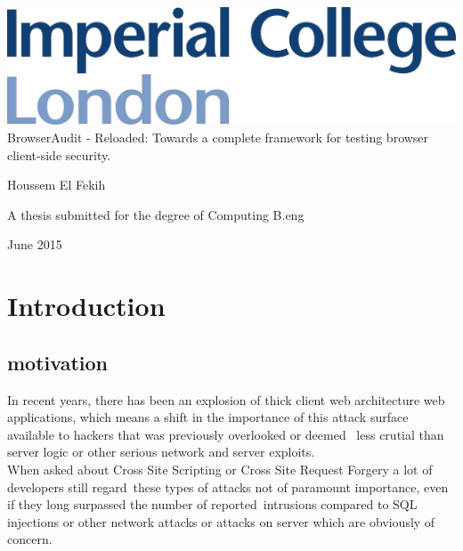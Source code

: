 \documentclass[a4paper,12pt]{report}
\begin{document}
\thispagestyle{empty}
\begin{center}
\begin{minipage}{0.75\linewidth}
    \centering
    \includegraphics[width=1\linewidth]{logo.jpg}
    \vspace{5cm}
    {\Large BrowserAudit - Reloaded: Towards a complete framework for testing browser client-side security.}
    \vspace{3cm}
    {\Large Houssem El Fekih\par}
    \vspace{3cm}
    {\Large A thesis submitted for the degree of Computing B.eng\par}
    \vspace{3cm}
    {\Large June 2015}
\end{minipage}
\end{center}
\clearpage


\begin{abstract}
 
\end{abstract}


\tableofcontents
\listoffigures
\listoftables

\pagebreak
{}

\section{Introduction}

\subsection{motivation}
In recent years, there has been an explosion of thick client web architecture web applications,
which means a shift in the importance of this attack surface available to hackers that was previously overlooked or deemed \
less crutial than server logic or other serious network and server exploits.\\

When asked about Cross Site Scripting or Cross Site Request Forgery a lot of developers still regard\
these types of attacks not of paramount importance, even if they long surpassed the number of reported\
intrusions compared to SQL injections or other network attacks or attacks on server which are obviously of concern.\\
\end{document}
